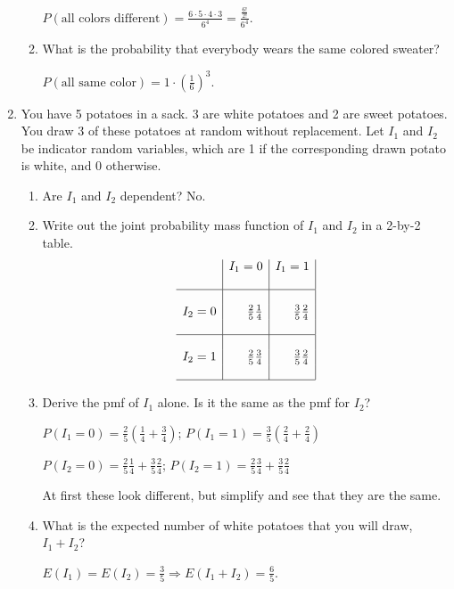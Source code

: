 \documentclass[11pt]{article}
\begin{document}
\begin{enumerate}
\begin{enumerate}
    {\color{red} $P(\textrm{all colors different}) = \frac{6 \cdot 5 \cdot 4 \cdot 3}{6^4} = \frac{\frac{6!}{2!}}{6^4}$.}
\item What is the probability that everybody wears the same colored sweater?

    {\color{red} $P(\textrm{all same color}) = 1 \cdot \left( \frac{1}{6} \right)^3$.}
\end{enumerate}

\item You have 5 potatoes in a sack. 3 are white potatoes and 2 are sweet potatoes. You draw 3 of these potatoes at random without replacement. Let $I_1$ and $I_2$ be indicator random variables, which are 1 if the corresponding drawn potato is white, and 0 otherwise.
\begin{enumerate}
\item Are $I_1$ and $I_2$ dependent? {\color{red} No.}
\item Write out the joint probability mass function of $I_1$ and $I_2$ in a 2-by-2 table.
    {\color{red}
    $$
    \begin{array}{r|r|r|}
        &   I_1 = 0 & I_1 = 1\\
    &&\\
    \hline
    &&\\
    I_2 = 0 & \frac{2}{5}\frac{1}{4}    &   \frac{3}{5} \frac{2}{4}\\
    &&\\
    \hline
    &&\\
    I_2 = 1 & \frac{2}{5}\frac{3}{4}    &   \frac{3}{5} \frac{2}{4}\\
    &&\\
    \hline
    \end{array}
    $$}
\item Derive the pmf of $I_1$ alone. Is it the same as the pmf for $I_2$?

    {\color{red}
    $P(I_1 = 0) = \frac{2}{5}\left(\frac{1}{4}+\frac{3}{4}\right)$; $P(I_1 = 1) = \frac{3}{5}\left(\frac{2}{4} + \frac{2}{4}\right)$

    $P(I_2 = 0) = \frac{2}{5}\frac{1}{4}+\frac{3}{5}\frac{2}{4}$; $P(I_2 = 1) = \frac{2}{5}\frac{3}{4}+\frac{3}{5}\frac{2}{4}$

    At first these look different, but simplify and see that they are the same.}
\item What is the expected number of white potatoes that you will draw, $I_1 + I_2$?
    
   {\color{red}
    $E(I_1) = E(I_2) = \frac{3}{5} \Rightarrow E(I_1 + I_2) = \frac{6}{5}$.}
\end{enumerate}


\end{enumerate}
\end{document}
